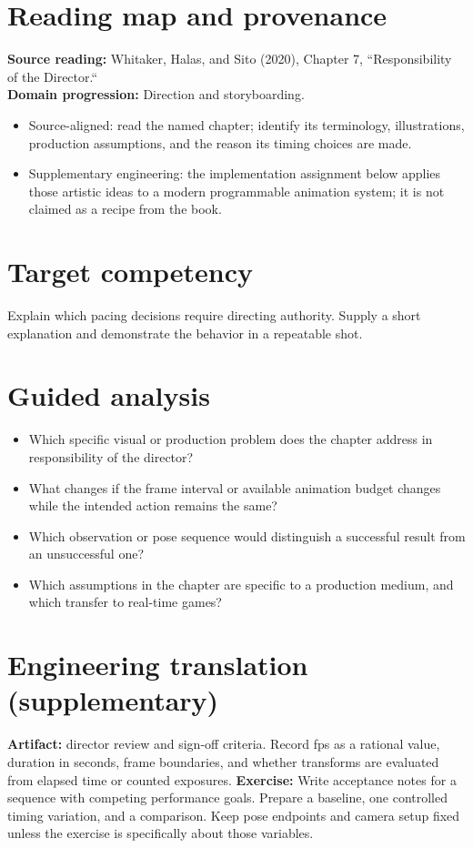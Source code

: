 \documentclass[10pt,letterpaper]{article}
\begin{document}
\makedoctitle
\makedocsummary

\section{Reading map and provenance}
\textbf{Source reading:} Whitaker, Halas, and Sito (2020), Chapter 7, ``Responsibility of the Director.``\\
\textbf{Domain progression:} Direction and storyboarding.
\begin{itemize}
\item Source-aligned: read the named chapter; identify its terminology, illustrations, production assumptions, and the reason its timing choices are made.
\item Supplementary engineering: the implementation assignment below applies those artistic ideas to a modern programmable animation system; it is not claimed as a recipe from the book.
\end{itemize}
\section{Target competency}
Explain which pacing decisions require directing authority. Supply a short explanation and demonstrate the behavior in a repeatable shot.
\section{Guided analysis}
\begin{itemize}
\item Which specific visual or production problem does the chapter address in responsibility of the director?
\item What changes if the frame interval or available animation budget changes while the intended action remains the same?
\item Which observation or pose sequence would distinguish a successful result from an unsuccessful one?
\item Which assumptions in the chapter are specific to a production medium, and which transfer to real-time games?
\end{itemize}
\section{Engineering translation (supplementary)}
\textbf{Artifact:} director review and sign-off criteria. Record fps as a rational value, duration in seconds, frame boundaries, and whether transforms are evaluated from elapsed time or counted exposures.
\textbf{Exercise:} Write acceptance notes for a sequence with competing performance goals. Prepare a baseline, one controlled timing variation, and a comparison. Keep pose endpoints and camera setup fixed unless the exercise is specifically about those variables.
\end{document}
